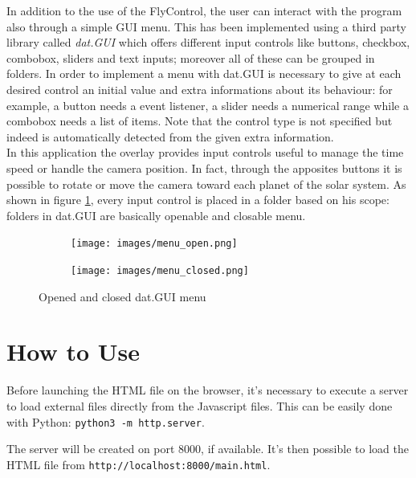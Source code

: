 \documentclass[paper=a4, fontsize=11pt]{scrartcl} %
\numberwithin{equation}{section} %
\numberwithin{figure}{section} %
\numberwithin{table}{section} %
\theoremstyle{definition}
\begin{document}
In addition to the use of the FlyControl, the user can interact with the program also through a simple GUI menu. This has been implemented using a third party library called \textit{dat.GUI} \cite{datgui} which offers different input controls like buttons, checkbox, combobox, sliders and text inputs; moreover all of these can be grouped in folders. In order to implement a menu with dat.GUI is necessary to give at each desired control an initial value and extra informations about its behaviour: for example, a button needs a event listener, a slider needs a numerical range while a combobox needs a list of items. Note that the control type is not specified but indeed is automatically detected from the given extra information.\\
In this application the overlay provides input controls useful to manage the time speed or handle the camera position. In fact, through the apposites buttons it is possible to rotate or move the camera toward each planet of the solar system.
As shown in figure \ref{fig:menu}, every input control is placed in a folder based on his scope: folders in dat.GUI are basically openable and closable menu.\\

\begin{figure}
	\centering
	\begin{subfigure}{.4\textwidth}
		\centering
		\texttt{[image: images/menu\_open.png]}
	\end{subfigure}
	\begin{subfigure}{.4\textwidth}
		\centering
		\texttt{[image: images/menu\_closed.png]}
	\end{subfigure}
	\caption{Opened and closed dat.GUI menu}
	\label{fig:menu}
\end{figure}


\section{How to Use}

Before launching the HTML file on the browser, it's necessary to execute a
server to load external files directly from the Javascript files. This can be
easily done with Python: \texttt{python3 -m http.server}.

The server will be created on port 8000, if available. It's then possible
to load the HTML file from \texttt{http://localhost:8000/main.html}.
\end{document}
